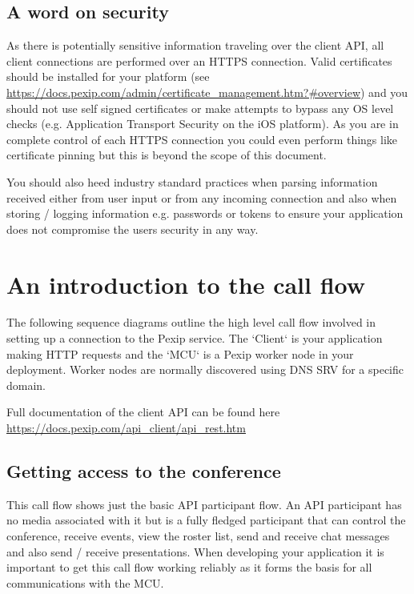 \documentclass[a4paper,11pt]{article}
\begin{document}
\subsection{A word on security}
\label{sec:org63e361e}

As there is potentially sensitive information traveling over the
client API, all client connections are performed over an HTTPS
connection.  Valid certificates should be installed for your platform
(see
\url{https://docs.pexip.com/admin/certificate\_management.htm?\#overview}) and
you should not use self signed certificates or make attempts to bypass
any OS level checks (e.g. Application Transport Security on the iOS
platform).  As you are in complete control of each HTTPS connection
you could even perform things like certificate pinning but this is
beyond the scope of this document.

You should also heed industry standard practices when parsing
information received either from user input or from any incoming
connection and also when storing / logging information e.g. passwords
or tokens to ensure your application does not compromise the users
security in any way.

\section{An introduction to the call flow}
\label{sec:orgf69c0b4}

The following sequence diagrams outline the high level call flow
involved in setting up a connection to the Pexip service.  The
`Client` is your application making HTTP requests and the `MCU` is a
Pexip worker node in your deployment.  Worker nodes are normally
discovered using DNS SRV for a specific domain.

Full documentation of the client API can be found here
\url{https://docs.pexip.com/api\_client/api\_rest.htm}

\subsection{Getting access to the conference}
\label{sec:org6078f59}

This call flow shows just the basic API participant flow.  An API
participant has no media associated with it but is a fully fledged
participant that can control the conference, receive events, view the
roster list, send and receive chat messages and also send / receive
presentations.  When developing your application it is important to
get this call flow working reliably as it forms the basis for all
communications with the MCU.
\end{document}
